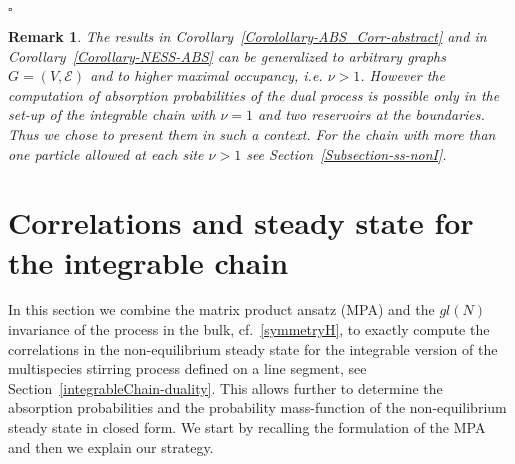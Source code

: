 \documentclass[10pt]{article}
\numberwithin{equation}{section}
\numberwithin{equation}{subsection}
\newtheorem{remark}{Remark}
\newcommand{\fra}[1]{\textcolor[rgb]{0,0,1}{#1}}
\begin{document}
\begin{flushright}
	$\square$
\end{flushright}
\begin{remark}\label{Remark-extension-graph-nu}
	The results in Corollary~\ref{Corolollary-ABS_Corr-abstract} and in Corollary~\ref{Corollary-NESS-ABS}  can be generalized to arbitrary graphs $G=(V,\mathcal{E})$ and to {higher maximal occupancy}, i.e. $\nu >1$.
	However the computation of absorption probabilities of the dual process is possible only in the set-up of the integrable chain with $\nu =1$ and two reservoirs at the boundaries.
	Thus we chose to present them in such a context. For the chain with {more than one particle allowed at each site} $\nu >1$ see Section~\ref{Subsection-ss-nonI}.
\end{remark}





\section{Correlations and steady state  for the integrable chain}\label{sectionIntegrabiliy}
In this section we combine the matrix product ansatz (MPA) \cite{vanicat2017exact} and  the $gl(N)$ invariance of the process in the bulk, cf.~\eqref{symmetryH}, to exactly compute the correlations in the non-equilibrium steady state
 for the integrable version of the multispecies stirring process \fra{defined on a line segment}, see Section~\ref{integrableChain-duality}. 
This allows further to determine the absorption probabilities and the probability mass-function of the non-equilibrium steady state in closed form.
We start by recalling the formulation of the MPA  and then we explain our strategy.
\end{document}
